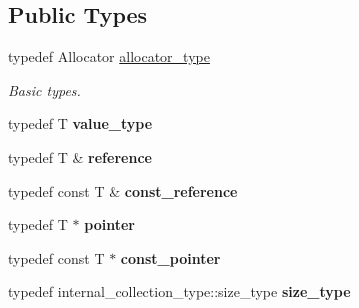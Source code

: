 \subsection*{Public Types}
\begin{DoxyCompactItemize}
\item 
\hypertarget{classtbb_1_1interface6_1_1enumerable__thread__specific_ad50ceae1b0e91d0fd31fe506e690692b}{}typedef Allocator \hyperlink{classtbb_1_1interface6_1_1enumerable__thread__specific_ad50ceae1b0e91d0fd31fe506e690692b}{allocator\+\_\+type}\label{classtbb_1_1interface6_1_1enumerable__thread__specific_ad50ceae1b0e91d0fd31fe506e690692b}

\begin{DoxyCompactList}\small\item\em Basic types. \end{DoxyCompactList}\item 
\hypertarget{classtbb_1_1interface6_1_1enumerable__thread__specific_a931b97e237cd2ed6eabe0d939bd141da}{}typedef T {\bfseries value\+\_\+type}\label{classtbb_1_1interface6_1_1enumerable__thread__specific_a931b97e237cd2ed6eabe0d939bd141da}

\item 
\hypertarget{classtbb_1_1interface6_1_1enumerable__thread__specific_a353a42e7bdda1720b7150cca99cf730b}{}typedef T \& {\bfseries reference}\label{classtbb_1_1interface6_1_1enumerable__thread__specific_a353a42e7bdda1720b7150cca99cf730b}

\item 
\hypertarget{classtbb_1_1interface6_1_1enumerable__thread__specific_a6c722a4b20fb6cae21316240b61d98d2}{}typedef const T \& {\bfseries const\+\_\+reference}\label{classtbb_1_1interface6_1_1enumerable__thread__specific_a6c722a4b20fb6cae21316240b61d98d2}

\item 
\hypertarget{classtbb_1_1interface6_1_1enumerable__thread__specific_ad88abc185701214e53e81973235ab6de}{}typedef T $\ast$ {\bfseries pointer}\label{classtbb_1_1interface6_1_1enumerable__thread__specific_ad88abc185701214e53e81973235ab6de}

\item 
\hypertarget{classtbb_1_1interface6_1_1enumerable__thread__specific_a4aff438f46812452ab4a6f893df94fc3}{}typedef const T $\ast$ {\bfseries const\+\_\+pointer}\label{classtbb_1_1interface6_1_1enumerable__thread__specific_a4aff438f46812452ab4a6f893df94fc3}

\item 
\hypertarget{classtbb_1_1interface6_1_1enumerable__thread__specific_a65e9cdc58e19d96b31b467c70c79122d}{}typedef internal\+\_\+collection\+\_\+type\+::size\+\_\+type {\bfseries size\+\_\+type}\label{classtbb_1_1interface6_1_1enumerable__thread__specific_a65e9cdc58e19d96b31b467c70c79122d}


\end{DoxyCompactItemize}
